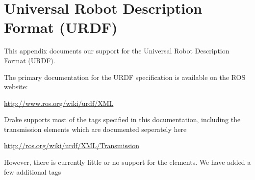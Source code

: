 
\chapter{Universal Robot Description Format (URDF)}

This appendix documents our support for the Universal Robot Description Format (URDF).

The primary documentation for the URDF specification is available on the ROS website:\\
\centerline{ \url{http://www.ros.org/wiki/urdf/XML}}

\smallskip \noindent
Drake supports most of the tags specified in this documentation, including the transmission elements which are documented seperately here\\ \centerline{\url{http://ros.org/wiki/urdf/XML/Transmission}}  

\smallskip
However, there is currently little or no support for the  elements.  We have added a few additional tags

